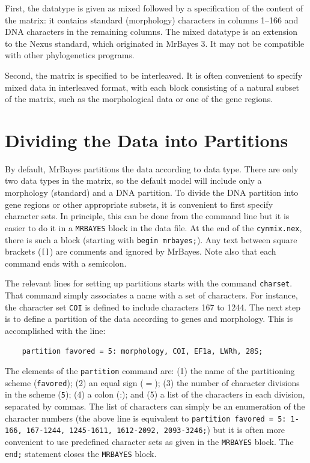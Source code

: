 \documentclass[12pt]{book}
\newcommand{\ttt}[1]{\texttt{#1}}
\begin{document}
First, the datatype is given as mixed followed by a specification of the content of the matrix: it
contains standard (morphology) characters in columns 1--166 and DNA characters in the remaining
columns. The mixed datatype is an extension to the Nexus standard, which originated in MrBayes 3.
It may not be compatible with other phylogenetics programs.

Second, the matrix is specified to be interleaved. It is often convenient to specify mixed data in
interleaved format, with each block consisting of a natural subset of the matrix, such as the
morphological data or one of the gene regions.

\section{Dividing the Data into Partitions}

By default, MrBayes partitions the data according to data type. There are only two data types in
the matrix, so the default model will include only a morphology (standard) and a DNA partition. To
divide the DNA partition into gene regions or other appropriate subsets, it is convenient to first
specify character sets. In principle, this can be done from the command line but it is easier to do
it in a \texttt{MRBAYES} block in the data file. At the end of the \texttt{cynmix.nex}, there is such a
block (starting with \texttt{begin mrbayes;}). Any text between square brackets (\texttt{[]}) are
comments and ignored by MrBayes. Note also that each command ends with a semicolon.

The relevant lines for setting up partitions starts with the command \texttt{charset}. That command
simply associates a name with a set of characters. For instance, the character set \texttt{COI} is
defined to include characters 167 to 1244. The next step is to define a partition of the data
according to genes and morphology. This is accomplished with the line:

\begin{singlespacing}
\footnotesize
\begin{verbatim}
    partition favored = 5: morphology, COI, EF1a, LWRh, 28S;
\end{verbatim}
\normalsize
\end{singlespacing}

The elements of the \ttt{partition} command are: (1) the name of the partitioning scheme
(\texttt{favored}); (2) an equal sign ($=$); (3) the number of character divisions in the scheme
(\texttt{5}); (4) a colon (:); and (5) a list of the characters in each division, separated by commas.
The list of characters can simply be an enumeration of the character numbers (the above line is
equivalent to \texttt{partition favored = 5: 1-166, 167-1244, 1245-1611, 1612-2092, 2093-3246;}) but
it is often more convenient to use predefined character sets as given in the \texttt{MRBAYES} block.
The \texttt{end;} statement closes the \texttt{MRBAYES} block.
\end{document}
